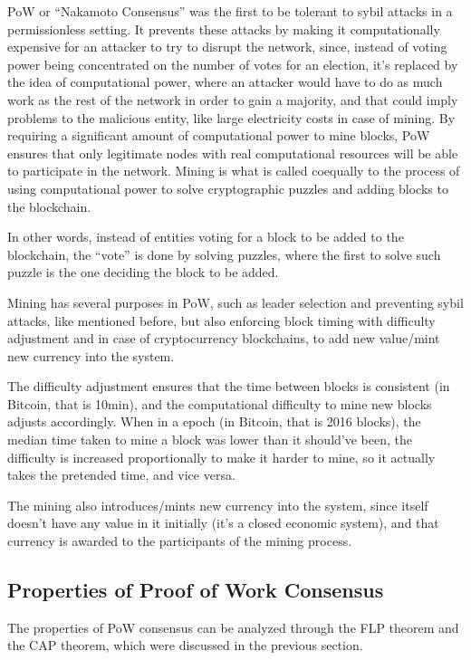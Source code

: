 PoW or ``Nakamoto Consensus'' was the first to be tolerant to sybil attacks in a permissionless setting.
It prevents these attacks by making it computationally expensive for an attacker to try to disrupt the network, since, instead of voting power being concentrated on the number of votes for an election, it's replaced by the idea of computational power, where an attacker would have to do as much work as the rest of the network in order to gain a majority, and that could imply problems to the malicious entity, like large electricity costs in case of mining.
By requiring a significant amount of computational power to mine blocks, PoW ensures that only legitimate nodes with real computational resources will be able to participate in the network.
Mining is what is called coequally to the process of using computational power to solve cryptographic puzzles and adding blocks to the blockchain.

In other words, instead of entities voting for a block to be added to the blockchain, the ``vote'' is done by solving puzzles, where the first to solve such puzzle is the one deciding the block to be added.

Mining has several purposes in PoW, such as leader selection and preventing sybil attacks, like mentioned before, but also enforcing block timing with difficulty adjustment and in case of cryptocurrency blockchains, to add new value/mint new currency into the system. 

The difficulty adjustment ensures that the time between blocks is consistent (in Bitcoin, that is 10min), and the computational difficulty to mine new blocks adjusts accordingly. When in a epoch (in Bitcoin, that is 2016 blocks), the median time taken to mine a block was lower than it should've been, the difficulty is increased proportionally to make it harder to mine, so it actually takes the pretended time, and vice versa.

The mining also introduces/mints new currency into the system, since itself doesn't have any value in it initially (it's a closed economic system), and that currency is awarded to the participants of the mining process.


\subsection*{Properties of Proof of Work Consensus}

The properties of PoW consensus can be analyzed through the FLP theorem and the CAP theorem, which were discussed in the previous section.

